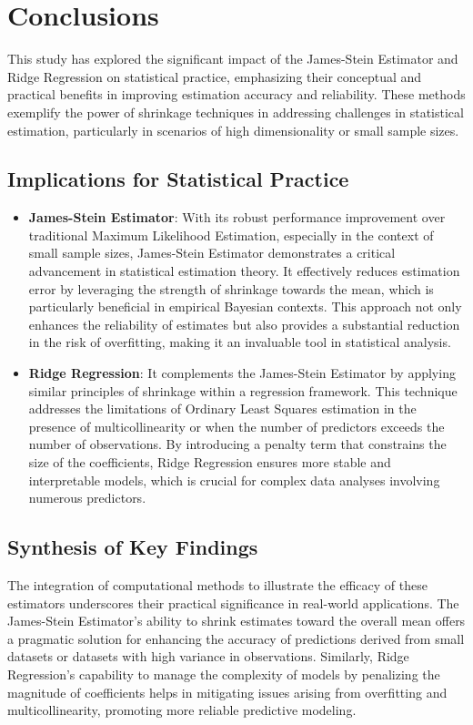 \section{Conclusions}

This study has explored the significant impact of the James-Stein Estimator and Ridge Regression on statistical practice, emphasizing their conceptual and practical benefits in improving estimation accuracy and reliability. These methods exemplify the power of shrinkage techniques in addressing challenges in statistical estimation, particularly in scenarios of high dimensionality or small sample sizes.

\subsection{Implications for Statistical Practice}

\begin{itemize}
    \item \textbf{James-Stein Estimator}: With its robust performance improvement over traditional Maximum Likelihood Estimation, especially in the context of small sample sizes, James-Stein Estimator demonstrates a critical advancement in statistical estimation theory. It effectively reduces estimation error by leveraging the strength of shrinkage towards the mean, which is particularly beneficial in empirical Bayesian contexts. This approach not only enhances the reliability of estimates but also provides a substantial reduction in the risk of overfitting, making it an invaluable tool in statistical analysis.
    \item \textbf{Ridge Regression}: It complements the James-Stein Estimator by applying similar principles of shrinkage within a regression framework. This technique addresses the limitations of Ordinary Least Squares estimation in the presence of multicollinearity or when the number of predictors exceeds the number of observations. By introducing a penalty term that constrains the size of the coefficients, Ridge Regression ensures more stable and interpretable models, which is crucial for complex data analyses involving numerous predictors.
\end{itemize}

\subsection{Synthesis of Key Findings}

The integration of computational methods to illustrate the efficacy of these estimators underscores their practical significance in real-world applications. The James-Stein Estimator's ability to shrink estimates toward the overall mean offers a pragmatic solution for enhancing the accuracy of predictions derived from small datasets or datasets with high variance in observations. Similarly, Ridge Regression's capability to manage the complexity of models by penalizing the magnitude of coefficients helps in mitigating issues arising from overfitting and multicollinearity, promoting more reliable predictive modeling.
